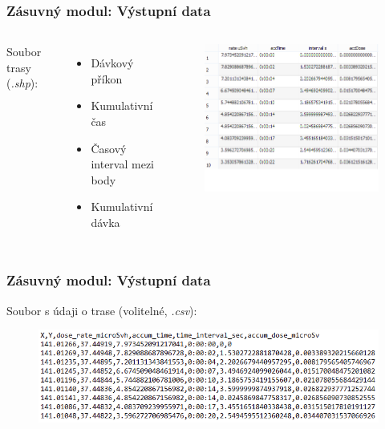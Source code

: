 \documentclass{beamer}
\begin{document}
\begin{frame}
\frametitle{Zásuvný modul: Výstupní data}

\begin{columns}

	Soubor trasy (\textit{.shp}):
	\begin{itemize}
		\item Dávkový příkon
		\item Kumulativní čas
		\item Časový interval mezi body
		\item Kumulativní dávka

	\end{itemize}
	\begin{figure}[H] \centering
		\includegraphics[scale=0.5]{./pictures/shapefile.png}
	\end{figure}
\end{columns}


\end{frame}

\begin{frame}
\frametitle{Zásuvný modul: Výstupní data}

Soubor s údaji o trase (volitelné, \textit{.csv}):

	\begin{figure}[H] \centering
		\includegraphics[scale=0.5]{./pictures/csv.png}
	\end{figure}



\end{frame}
\end{document}

